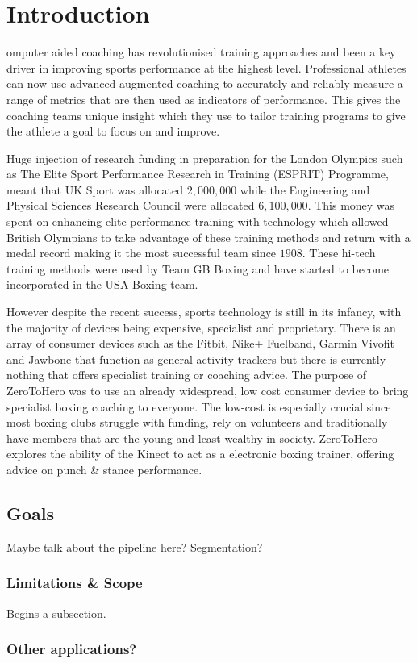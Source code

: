 %
%
\let\textcircled=\pgftextcircled
\chapter{Introduction}
\label{chap:intro}

omputer aided coaching has revolutionised training approaches and been a key driver in improving sports performance at the highest level. Professional athletes can now use advanced augmented coaching to accurately and reliably measure a range of metrics that are then used as indicators of performance.\cite{aug0} This gives the coaching teams unique insight which they use to tailor training programs to give the athlete a goal to focus on and improve.\newline

Huge injection of research funding in preparation for the London Olympics such as The Elite Sport Performance Research in Training (ESPRIT) Programme, meant that UK Sport was allocated \textsterling $2,000,000$  while the Engineering and Physical Sciences Research Council were allocated \textsterling $6,100,000$.\cite{aug5} This money was spent on enhancing elite performance training with technology \cite{aug3} \cite{aug4} which allowed British Olympians to take advantage of these training methods and return with a medal record making it the most successful team since $1908$.\cite{olymp1} These hi-tech training methods were used by Team GB Boxing \cite{aug2} and have started to become incorporated in the USA Boxing team.\cite{aug1}

However despite the recent success, {sports technology} is still in its infancy, with the majority of devices being expensive, specialist and proprietary\cite{aug7}. There is an array of consumer devices such as the Fitbit, Nike+ Fuelband, Garmin Vivofit and Jawbone that function as general activity trackers but there is currently nothing that offers specialist training or coaching advice. The purpose of ZeroToHero was to use an already widespread, low cost consumer device to bring specialist boxing coaching to everyone. The low-cost is especially crucial since most boxing clubs struggle with funding, rely on volunteers and traditionally have members that are the young and least wealthy in society.\newline
ZeroToHero explores the ability of the Kinect to act as a electronic boxing trainer, offering advice on punch \& stance performance.
\section{Goals}
\label{sec:sec01}

Maybe talk about the pipeline here? Segmentation?

\subsection{Limitations \& Scope}
\label{subsec:subsec01}
Begins a subsection.


\subsection{Other applications?}
\label{subsec:subsec01}

